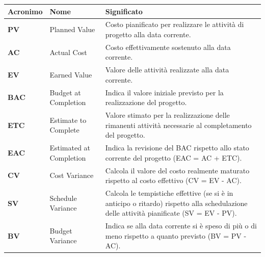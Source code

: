 \begin{table}[h!]
\centering
\def\arraystretch{1.5}
\begin{tabular}{ |m{2cm}|m{4cm}|m{8cm}| }
\hline
\rowcolor{lightgray!30}
\textbf{Acronimo} & \textbf{Nome} & \textbf{Significato}\\
\hline
\textbf{PV} & Planned Value & Costo pianificato per realizzare le attività di progetto alla data corrente.\\
\hline
\textbf{AC} & Actual Cost & Costo effettivamente sostenuto alla data corrente.\\
\hline
\textbf{EV} & Earned Value & Valore delle attività realizzate alla data corrente.\\
\hline
\textbf{BAC} & Budget at Completion & Indica il valore iniziale previsto per la realizzazione del progetto.\\
\hline
\textbf{ETC} & Estimate to Complete & Valore stimato per la realizzazione delle rimanenti attività necessarie al completamento del progetto.\\
\hline
\textbf{EAC} & Estimated at Completion & Indica la revisione del BAC rispetto allo stato corrente del progetto (EAC = AC + ETC).\\
\hline
\textbf{CV} & Cost Variance & Calcola il valore del costo realmente maturato rispetto al costo effettivo (CV = EV - AC).\\
\hline
\textbf{SV} & Schedule Variance & Calcola le tempistiche effettive (se si è in anticipo o ritardo) rispetto alla schedulazione delle attività pianificate (SV = EV - PV).\\
\hline
\textbf{BV} & Budget Variance & Indica se alla data corrente si è speso di più o di meno rispetto a quanto previsto (BV = PV - AC).\\
\hline
\end{tabular}
\end{table}

